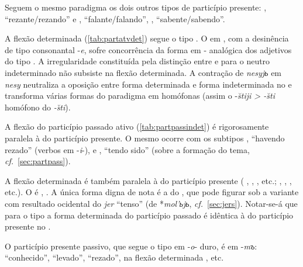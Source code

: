 


Seguem o mesmo paradigma os dois outros tipos de particípio presente:
,   ``rezante/rezando'' e
,   ``falante/falando'',
,   ``sabente/sabendo''.




A flexão determinada (\autoref{tab:partatvdet}) segue o tipo .
O  em , com a desinência de tipo consonantal
-\emph{e}, sofre concorrência da forma em - analógica
dos adjetivos do tipo .
A irregularidade constituída
pela distinção entre  e  para o neutro indeterminado não
subsiste na flexão determinada.
A contração de \emph{nesyjь} em
\emph{nesy} neutraliza a oposição entre forma determinada e forma
indeterminada no  e transforma várias formas do paradigma em
homófonas (assim o  -\emph{s̆tiji > -s̆ti}
homófono do   \emph{-s̆ti}).



A flexão do particípio passado ativo (\autoref{tab:partpassindet}) é
rigorosamente paralela à do particípio presente.
O mesmo ocorre com os subtipos
,   ``havendo rezado'' (verbos em
-\emph{i}-), e ,   ``tendo sido''
(sobre a formação do tema, \emph{cf.}~\ref{sec:partpass}).

A flexão determinada é também paralela à do particípio presente
( ,  ,
 , etc.; , 
,  , etc.).
O  é , .
A única forma digna de nota é a do  ,
que pode figurar
sob a variante  com resultado ocidental do \emph{jer}
``tenso'' (de *\emph{mol'ьjь}, \emph{cf.}~\ref{sec:jers}).
Notar-se-á que para o tipo
 a forma determinada do particípio passado é idêntica à
do particípio presente no .

O particípio presente passivo, que segue o tipo em -\emph{o}- duro, é em
-\emph{mъ}:  ``conhecido'', 
``levado'',  ``rezado'', na flexão determinada
,  etc.

